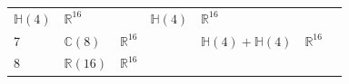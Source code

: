\documentclass{article}
\begin{document}
\begin{longtable}[]{@{}lllcllc@{}}
\begin{minipage}[t]{0.15\columnwidth}
\(\mathbb{H}(4)\)\strut
\end{minipage} & \begin{minipage}[t]{0.19\columnwidth}\raggedright
\(\mathbb{R}^{16}\)\strut
\end{minipage} & \begin{minipage}[t]{0.04\columnwidth}\centering
\strut
\end{minipage} & \begin{minipage}[t]{0.15\columnwidth}\raggedright
\(\mathbb{H}(4)\)\strut
\end{minipage} & \begin{minipage}[t]{0.19\columnwidth}\raggedright
\(\mathbb{R}^{16}\)\strut
\end{minipage} & \begin{minipage}[t]{0.04\columnwidth}\centering
\strut
\end{minipage}\tabularnewline
\begin{minipage}[t]{0.04\columnwidth}\raggedright
7\strut
\end{minipage} & \begin{minipage}[t]{0.15\columnwidth}\raggedright
\(\mathbb{C}(8)\)\strut
\end{minipage} & \begin{minipage}[t]{0.19\columnwidth}\raggedright
\(\mathbb{R}^{16}\)\strut
\end{minipage} & \begin{minipage}[t]{0.04\columnwidth}\centering
\strut
\end{minipage} & \begin{minipage}[t]{0.15\columnwidth}\raggedright
\(\mathbb{H}(4)+\mathbb{H}(4)\)\strut
\end{minipage} & \begin{minipage}[t]{0.19\columnwidth}\raggedright
\(\mathbb{R}^{16}\)\strut
\end{minipage} & \begin{minipage}[t]{0.04\columnwidth}\centering
\strut
\end{minipage}\tabularnewline
\begin{minipage}[t]{0.04\columnwidth}\raggedright
8\strut
\end{minipage} & \begin{minipage}[t]{0.15\columnwidth}\raggedright
\(\mathbb{R}(16)\)\strut
\end{minipage} & \begin{minipage}[t]{0.19\columnwidth}\raggedright
\(\mathbb{R}^{16}\)\strut
\end{minipage} & \begin{minipage}[t]{0.04\columnwidth}\centering

\end{minipage}
\end{longtable}
\end{document}
